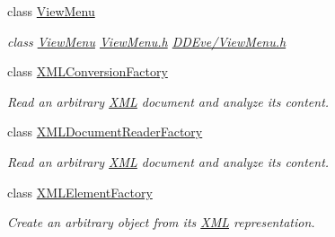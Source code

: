 \begin{DoxyCompactItemize}
class \hyperlink{class_d_d4hep_1_1_view_menu}{View\+Menu}
\begin{DoxyCompactList}\small\item\em class \hyperlink{class_d_d4hep_1_1_view_menu}{View\+Menu} \hyperlink{_view_menu_8h}{View\+Menu.\+h} \hyperlink{_view_menu_8h}{D\+D\+Eve/\+View\+Menu.\+h} \end{DoxyCompactList}\item 
class \hyperlink{class_d_d4hep_1_1_x_m_l_conversion_factory}{X\+M\+L\+Conversion\+Factory}
\begin{DoxyCompactList}\small\item\em Read an arbitrary \hyperlink{namespace_d_d4hep_1_1_x_m_l}{X\+ML} document and analyze it\textquotesingle{}s content. \end{DoxyCompactList}\item 
class \hyperlink{class_d_d4hep_1_1_x_m_l_document_reader_factory}{X\+M\+L\+Document\+Reader\+Factory}
\begin{DoxyCompactList}\small\item\em Read an arbitrary \hyperlink{namespace_d_d4hep_1_1_x_m_l}{X\+ML} document and analyze it\textquotesingle{}s content. \end{DoxyCompactList}\item 
class \hyperlink{class_d_d4hep_1_1_x_m_l_element_factory}{X\+M\+L\+Element\+Factory}
\begin{DoxyCompactList}\small\item\em Create an arbitrary object from it\textquotesingle{}s \hyperlink{namespace_d_d4hep_1_1_x_m_l}{X\+ML} representation. \end{DoxyCompactList}\end{DoxyCompactItemize}
